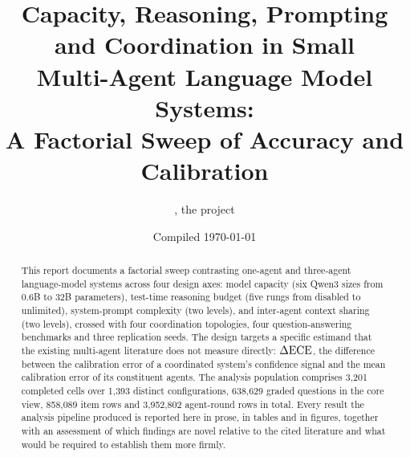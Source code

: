 \documentclass[11pt]{article}
\title{\textbf{Capacity, Reasoning, Prompting and Coordination in Small\\
Multi-Agent Language Model Systems:\\
A Factorial Sweep of Accuracy and Calibration}}
\author{\code{full\_sweep\_v1}, the \code{agents\_scaling} project}
\date{Compiled \today}
\begin{document}
\maketitle

\begin{abstract}
\noindent
This report documents a factorial sweep contrasting one-agent and three-agent
language-model systems across four design axes: model capacity (six Qwen3 sizes from
0.6B to 32B parameters), test-time reasoning budget (five rungs from disabled to
unlimited), system-prompt complexity (two levels), and inter-agent context sharing (two
levels), crossed with four coordination topologies, four question-answering benchmarks
and three replication seeds. The design targets a specific estimand that the existing
multi-agent literature does not measure directly: $\Delta\mathrm{ECE}$, the difference between the
calibration error of a coordinated system's confidence signal and the mean calibration
error of its constituent agents. The analysis population comprises 3{,}201 completed
cells over 1{,}393 distinct configurations, 638{,}629 graded questions in the core view,
858{,}089 item rows and 3{,}952{,}802 agent-round rows in total. Every result the
analysis pipeline produced is reported here in prose, in tables and in figures, together
with an assessment of which findings are novel relative to the cited literature and what
would be required to establish them more firmly.
\end{abstract}

\tableofcontents
\clearpage


\clearpage

\clearpage

\clearpage

\clearpage

\clearpage

\clearpage

\clearpage

\clearpage

\clearpage

\clearpage

\clearpage

\clearpage


\clearpage



\clearpage
\appendix

\clearpage

\clearpage
\ifexhaustive
  
  \clearpage
\fi

\clearpage
\ifexhaustive
  
  \clearpage
\fi

\end{document}
